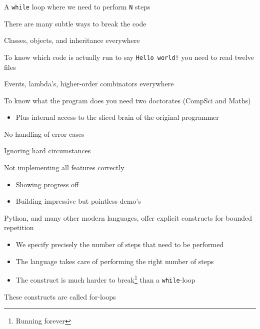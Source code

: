 \documentclass{beamer}
\begin{document}
\begin{slide}{
\item A \texttt{while} loop where we need to perform \texttt{N} steps
\item There are many subtle ways to break the code
}\end{slide}

\begin{slide}{
\item Classes, objects, and inheritance everywhere
\item To know which code is actually run to say \texttt{Hello world!} you need to read twelve files
}\end{slide}

\begin{slide}{
\item Events, lambda's, higher-order combinators everywhere
\item To know what the program does you need two doctorates (CompSci and Maths)
\begin{itemize}
\item Plus internal access to the sliced brain of the original programmer
\end{itemize}
}\end{slide}

\begin{slide}{
\item No handling of error cases
\item Ignoring hard circumstances
\pause
\item Not implementing all features correctly
\begin{itemize}
\item Showing progress off
\item Building impressive but pointless demo's
\end{itemize}
}\end{slide}

\begin{slide}{
\item Python, and many other modern languages, offer explicit constructs for bounded repetition
\begin{itemize}
\item We specify precisely the number of steps that need to be performed
\item The language takes care of performing the right number of steps
\item The construct is much harder to break\footnote{Running forever} than a \texttt{while}-loop
\end{itemize}
\item These constructs are called for-loops
}\end{slide}
\end{document}
